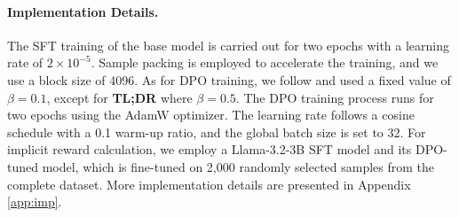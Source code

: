 {\paragraph{Implementation Details.} The SFT training of the base model is carried out for two epochs with a learning rate of $2\times10^{-5}$. 
Sample packing \citep{tunstall2023zephyr} is employed to accelerate the training, and we use a block size of 4096. 
As for DPO training, we follow \citet{rafailov2024direct} and used a fixed value of $\beta=0.1$, except for \textbf{TL;DR} where $\beta=0.5$. The DPO training process runs for two epochs using the AdamW optimizer. The learning rate follows a cosine schedule with a 0.1 warm-up ratio, and the global batch size is set to 32. For implicit reward calculation, we employ a Llama-3.2-3B SFT model and its DPO-tuned model, which is fine-tuned on 2,000 randomly selected samples from the complete dataset. More implementation details are presented in Appendix \ref{app:imp}.

}
